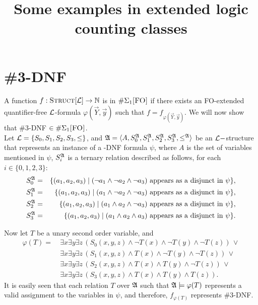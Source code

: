 \documentclass[12pt]{article}
\title{Some examples in extended logic counting classes}
\def\Eone{\#\Sigma_1\textsc{[FO]}}
\def\Truc{\textsc{Struct}[\L]}
\def\A{{\frak A}}
\def\L{{\cal L}}
\def\N{\mathbb{N}}
\def\Y{\vec{Y}}
\def\y{\vec{y}} %
\begin{document}
\maketitle

\section{{\sc \#3-DNF}}
A function $f:\Truc \to \N$ is in $\Eone$ if there exists an {\sc FO}-extended quantifier-free $\L$-formula $\varphi(\Y,\y)$ such that $f = f_{\varphi(\Y,\y)}$. We will now show that {\sc \#3-DNF} $\in\Eone$.\\

Let $\L = \{S_0,S_1,S_2,S_3,\leq\}$, and $\A = \langle A, S_0^\A, S_1^\A, S_2^\A, S_3^\A, \leq^\A \rangle$ be an $\L-$structure that represents an instance of a {-DNF} formula $\psi$, where $A$ is the set of variables mentioned in $\psi$, $S_i^\A$ is a ternary relation described as follows, for each $i\in\{0,1,2,3\}$:
\begin{eqnarray*}
S_0^\A &=& \{(a_1,a_2,a_3)\mid (\neg a_1 \wedge \neg a_2 \wedge \neg a_3) \mbox{ appears as a disjunct in }\psi\},\\
S_1^\A &=& \{(a_1,a_2,a_3)\mid ( a_1 \wedge \neg a_2 \wedge \neg a_3) \mbox{ appears as a disjunct in }\psi\},\\
S_2^\A &=& \{(a_1,a_2,a_3)\mid ( a_1 \wedge  a_2 \wedge \neg a_3) \mbox{ appears as a disjunct in }\psi\},\\
S_3^\A &=& \{(a_1,a_2,a_3)\mid ( a_1 \wedge  a_2 \wedge  a_3) \mbox{ appears as a disjunct in }\psi\}.
\end{eqnarray*}

Now let $T$ be a unary second order variable, and
\begin{align*}
\varphi(T) =\ &\exists x \exists y \exists z \,(S_0(x,y,z) \wedge \neg T(x) \wedge \neg T(y) \wedge \neg T(z))\,\vee \\
&\exists x \exists y \exists z \,(S_1(x,y,z) \wedge T(x) \wedge \neg T(y) \wedge \neg T(z))\,\vee \\
&\exists x \exists y \exists z \,(S_2(x,y,z) \wedge T(x) \wedge T(y) \wedge \neg T(z))\,\vee \\
&\exists x \exists y \exists z \,(S_3(x,y,z) \wedge T(x) \wedge T(y) \wedge T(z)).
\end{align*}
It is easily seen that each relation $T$ over $\A$ such that $\A\models\varphi(T)$ represents a valid assignment to the variables in $\psi$, and therefore, $f_{\varphi(T)}$ represents {\sc \#3-DNF}.
\end{document}
